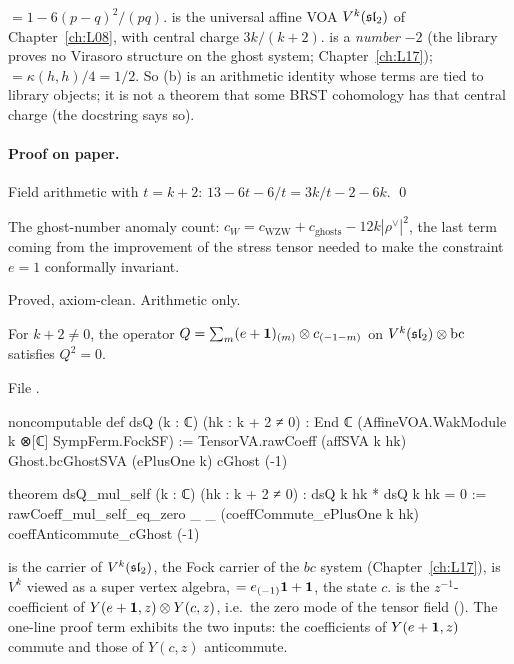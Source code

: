 \begin{dictionary}
 $= 1-6(p-q)^2/(pq)$.  is the universal
affine VOA $V^k(\mathfrak{sl}_2)$ of Chapter~\ref{ch:L08}, with central charge $3k/(k+2)$.
 is a \emph{number} $-2$ (the library proves no Virasoro structure on the ghost
system; Chapter~\ref{ch:L17});  $= \kappa(h,h)/4 = 1/2$. So (b) is an arithmetic identity
whose terms are tied to library objects; it is not a theorem that some BRST cohomology has that central charge
(the docstring says so).
\end{dictionary}

\paragraph{Proof on paper.} Field arithmetic with $t = k+2$: $13-6t-6/t = 3k/t-2-6k$. \qed

\begin{physics}
The ghost-number anomaly count: $c_W = c_{\text{WZW}} + c_{\text{ghosts}} - 12k|\rho^\vee|^2$, the last term
coming from the improvement of the stress tensor needed to make the constraint $e=1$ conformally invariant.
\end{physics}

\begin{status}
Proved, axiom-clean. Arithmetic only.
\end{status}

\begin{theorem}\label{l19:thm:dsq}
For $k+2\ne0$, the operator $Q = \sum_m (e+\mathbf{1})_{(m)}\otimes c_{(-1-m)}$ on
$V^k(\mathfrak{sl}_2)\otimes\mathrm{bc}$ satisfies $Q^2 = 0$.
\end{theorem}

\noindent File .
\begin{leancode}
noncomputable def dsQ (k : ℂ) (hk : k + 2 ≠ 0) :
    End ℂ (AffineVOA.WakModule k ⊗[ℂ] SympFerm.FockSF) :=
  TensorVA.rawCoeff (affSVA k hk) Ghost.bcGhostSVA (ePlusOne k) cGhost (-1)

theorem dsQ_mul_self (k : ℂ) (hk : k + 2 ≠ 0) : dsQ k hk * dsQ k hk = 0 :=
  rawCoeff_mul_self_eq_zero _ _ (coeffCommute_ePlusOne k hk) coeffAnticommute_cGhost (-1)
\end{leancode}

\begin{dictionary}
 is the carrier of $V^k(\mathfrak{sl}_2)$,  the Fock carrier of the $bc$
system  (Chapter~\ref{ch:L17}),  is $V^k$ viewed as a super vertex algebra,
 $= e_{(-1)}\mathbf{1}+\mathbf{1}$,  the state $c$.  is
the $z^{-1}$-coefficient of $Y(e+\mathbf{1},z)\otimes Y(c,z)$, i.e.\ the zero mode of the tensor field
(). The one-line proof term exhibits the two inputs: the coefficients of $Y(e+\mathbf{1},z)$
commute and those of $Y(c,z)$ anticommute.
\end{dictionary}

